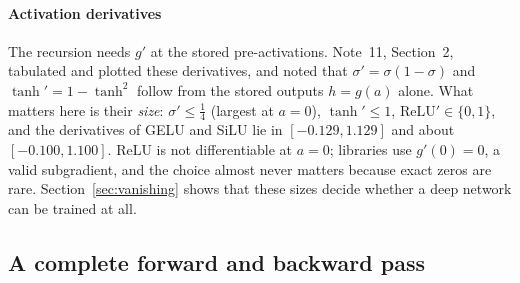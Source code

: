 \documentclass[11pt]{article}
\begin{document}
\paragraph{Activation derivatives} The recursion needs $g'$ at the stored pre-activations. Note~11, Section~2,
tabulated and plotted these derivatives, and noted that $\sigma' = \sigma(1 - \sigma)$ and $\tanh' = 1 - \tanh^2$ follow
from the stored outputs $h = g(a)$ alone. What matters here is their \emph{size}: $\sigma' \le \frac14$ (largest at
$a = 0$), $\tanh' \le 1$, ReLU$' \in \{0, 1\}$, and the derivatives of GELU and SiLU lie in $[-0.129, 1.129]$ and about
$[-0.100, 1.100]$. ReLU is not differentiable at $a = 0$; libraries use $g'(0) = 0$, a valid subgradient, and the choice
almost never matters because exact zeros are rare. Section~\ref{sec:vanishing} shows that these sizes decide whether a
deep network can be trained at all.

\subsection{A complete forward and backward pass}\label{sec:example}
\end{document}

